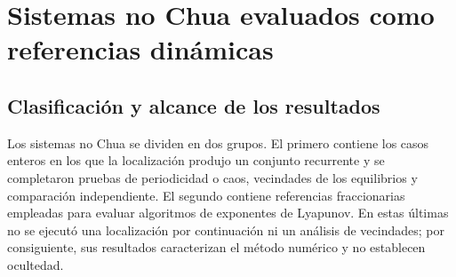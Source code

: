 \section{Sistemas no Chua evaluados como referencias dinámicas}
\label{sec:nonchua-dynamic-benchmarks}

\subsection{Clasificación y alcance de los resultados}

Los sistemas no Chua se dividen en dos grupos. El primero contiene
los casos enteros en los que la localización produjo un conjunto recurrente y
se completaron pruebas de periodicidad o caos, vecindades de los equilibrios y
comparación independiente. El segundo contiene
referencias fraccionarias empleadas para evaluar algoritmos de exponentes de
Lyapunov. En estas últimas no se ejecutó una localización por continuación ni un
análisis de vecindades; por consiguiente, sus resultados caracterizan el método
numérico y no establecen ocultedad.

